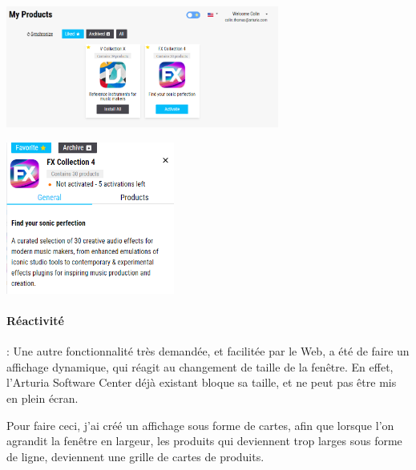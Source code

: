 \documentclass[francais]{rapportPFE}  %
\begin{document}
\begin{center}
    \centering
    \begin{minipage}{.5\textwidth}
    \centering
    \includegraphics[height=4cm]{graphics/favorite.png}
    \label{fig:test1}
    \end{minipage}%
    \begin{minipage}{.5\textwidth}
    \centering
    \includegraphics[height=5cm]{graphics/favorite_details.png}
    \label{fig:test2}
    \end{minipage}
    \end{center}

\paragraph{Réactivité}: Une autre fonctionnalité très demandée, et facilitée par le Web, a été de faire un affichage dynamique, qui réagit au changement de taille de la fenêtre. En effet, l'Arturia Software Center déjà existant bloque sa taille, et ne peut pas être mis en plein écran.

Pour faire ceci, j'ai créé un affichage sous forme de cartes, afin que lorsque l'on agrandit la fenêtre en largeur, les produits qui deviennent trop larges sous forme de ligne, deviennent une grille de cartes de produits.
\end{document}
